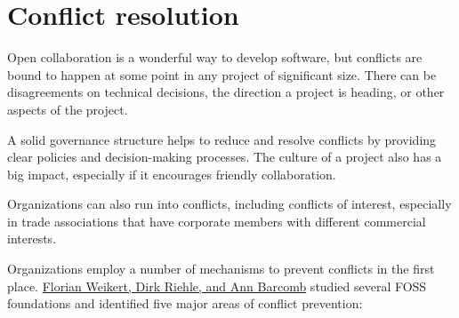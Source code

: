 


\chapter{Conflict resolution}

Open collaboration is a wonderful way to develop software, but conflicts are bound to happen at some point in any project of significant size.  There can be disagreements on technical decisions, the direction a project is heading, or other aspects of the project.

A solid governance structure helps to reduce and resolve conflicts by providing clear policies and decision-making processes.  The culture of a project also has a big impact, especially if it encourages friendly collaboration.

Organizations can also run into conflicts, including conflicts of interest, especially in trade associations that have corporate members with different commercial interests.

Organizations employ a number of mechanisms to prevent conflicts in the first place.  \href{https://doi.org/10.1007/978-3-030-33742-1_11}{Florian Weikert, Dirk Riehle, and Ann Barcomb} studied several FOSS foundations and identified five major areas of conflict prevention:

